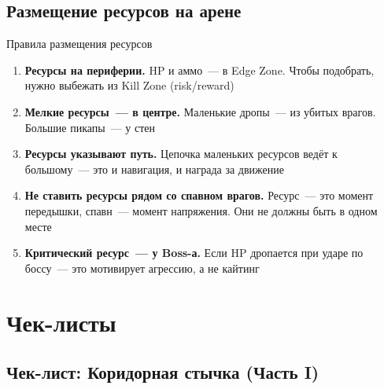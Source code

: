\documentclass[a4paper,11pt]{report}
\begin{document}
\section{Размещение ресурсов на арене}

\begin{rulebox}{Правила размещения ресурсов}
\begin{enumerate}[leftmargin=*]
  \item \textbf{Ресурсы на периферии.} HP и аммо~--- в Edge Zone.
    Чтобы подобрать, нужно выбежать из Kill Zone (risk/reward)
  \item \textbf{Мелкие ресурсы~--- в центре.} Маленькие дропы~---
    из убитых врагов. Большие пикапы~--- у стен
  \item \textbf{Ресурсы указывают путь.} Цепочка маленьких ресурсов
    ведёт к большому~--- это и навигация, и награда за движение
  \item \textbf{Не ставить ресурсы рядом со спавном врагов.}
    Ресурс~--- это момент передышки, спавн~--- момент напряжения.
    Они не должны быть в одном месте
  \item \textbf{Критический ресурс~--- у Boss-а.} Если HP дропается
    при ударе по боссу~--- это мотивирует агрессию, а не кайтинг
\end{enumerate}
\end{rulebox}


\chapter{Чек-листы}

\section{Чек-лист: Коридорная стычка (Часть I)}
\end{document}
